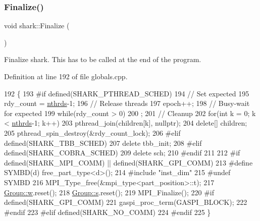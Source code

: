 \subsubsection{\texorpdfstring{Finalize()}{Finalize()}}
{\footnotesize\ttfamily void shark\+::\+Finalize (\begin{DoxyParamCaption}{ }\end{DoxyParamCaption})}

Finalize shark. This has to be called at the end of the program. 

Definition at line 192 of file globals.\+cpp.


\begin{DoxyCode}
192                      \{
193 \textcolor{preprocessor}{#if defined(SHARK\_PTHREAD\_SCHED)}
194     \textcolor{comment}{// Set expected}
195     rdy\_count = \hyperlink{namespaceshark_a4912c1d983c9655b4ed992ac1f99530f}{nthrds}-1;
196     \textcolor{comment}{// Release threads}
197     epoch++;
198     \textcolor{comment}{// Busy-wait for expected}
199     \textcolor{keywordflow}{while}(rdy\_count > 0)
200         ;
201     \textcolor{comment}{// Cleanup}
202     \textcolor{keywordflow}{for}(\textcolor{keywordtype}{int} k = 0; k < \hyperlink{namespaceshark_a4912c1d983c9655b4ed992ac1f99530f}{nthrds}-1; k++)
203         pthread\_join(children[k], \textcolor{keyword}{nullptr});
204     \textcolor{keyword}{delete}[] children;
205     pthread\_spin\_destroy(&rdy\_count\_lock);
206 \textcolor{preprocessor}{#elif defined(SHARK\_TBB\_SCHED)}
207     \textcolor{keyword}{delete} tbb\_init;
208 \textcolor{preprocessor}{#elif defined(SHARK\_COBRA\_SCHED)}
209     \textcolor{keyword}{delete} sch;
210 \textcolor{preprocessor}{#endif}
211 
212 \textcolor{preprocessor}{#if defined(SHARK\_MPI\_COMM) || defined(SHARK\_GPI\_COMM)}
213 \textcolor{preprocessor}{#define SYMBD(d) free\_part\_type<d>();}
214 \textcolor{preprocessor}{#include "inst\_dim"}
215 \textcolor{preprocessor}{#undef SYMBD}
216     MPI\_Type\_free(&mpi\_type<part\_position>::t);
217     \hyperlink{classshark_1_1_group_af542c8e71a81c12d6a73203ef9152d1f}{Group::w}.reset();
218     \hyperlink{classshark_1_1_group_a6c59f34c15be2873372cd006c2939da2}{Group::s}.reset();
219     MPI\_Finalize();
220 \textcolor{preprocessor}{#if defined(SHARK\_GPI\_COMM)}
221     gaspi\_proc\_term(GASPI\_BLOCK);
222 \textcolor{preprocessor}{#endif}
223 \textcolor{preprocessor}{#elif defined(SHARK\_NO\_COMM)}
224 \textcolor{preprocessor}{#endif}
225 \}
\end{DoxyCode}
\hypertarget{namespaceshark_acb17c538c18f0773515300329c3158e3}{}\label{namespaceshark_acb17c538c18f0773515300329c3158e3} 
